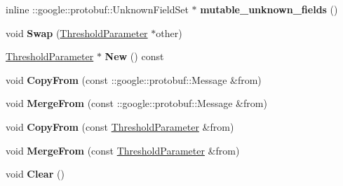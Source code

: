 \begin{DoxyCompactItemize}
\item 
\mbox{\label{classcaffe_1_1_threshold_parameter_ad4050bad300b5f7391f80a3fd3092652}} 
inline \+::google\+::protobuf\+::\+Unknown\+Field\+Set $\ast$ {\bfseries mutable\+\_\+unknown\+\_\+fields} ()
\item 
\mbox{\label{classcaffe_1_1_threshold_parameter_a65d719574eccf0914af64db50842f119}} 
void {\bfseries Swap} (\mbox{\hyperlink{classcaffe_1_1_threshold_parameter}{Threshold\+Parameter}} $\ast$other)
\item 
\mbox{\label{classcaffe_1_1_threshold_parameter_ac35e8a5246d09aba9e69a23b0f59722a}} 
\mbox{\hyperlink{classcaffe_1_1_threshold_parameter}{Threshold\+Parameter}} $\ast$ {\bfseries New} () const
\item 
\mbox{\label{classcaffe_1_1_threshold_parameter_af3cffd744c35d31f29af3fa163f47bfe}} 
void {\bfseries Copy\+From} (const \+::google\+::protobuf\+::\+Message \&from)
\item 
\mbox{\label{classcaffe_1_1_threshold_parameter_ae7a7639d44026fe29670b202b37386ee}} 
void {\bfseries Merge\+From} (const \+::google\+::protobuf\+::\+Message \&from)
\item 
\mbox{\label{classcaffe_1_1_threshold_parameter_aa578c11ce75bacb49eb584e33b872f5b}} 
void {\bfseries Copy\+From} (const \mbox{\hyperlink{classcaffe_1_1_threshold_parameter}{Threshold\+Parameter}} \&from)
\item 
\mbox{\label{classcaffe_1_1_threshold_parameter_ac9582a6d39a35a1f577172a9b4372f6a}} 
void {\bfseries Merge\+From} (const \mbox{\hyperlink{classcaffe_1_1_threshold_parameter}{Threshold\+Parameter}} \&from)
\item 
\mbox{\label{classcaffe_1_1_threshold_parameter_a7a5a3cb9bd9c6ceeccdae77a922b8983}} 
void {\bfseries Clear} ()
\item 
\mbox{\label{classcaffe_1_1_threshold_parameter_a7e91b39cbbe91ec236c7d96b6b4b9a89}} 

\end{DoxyCompactItemize}
